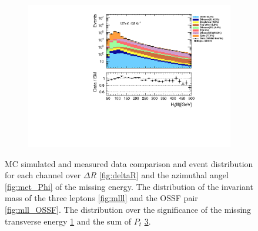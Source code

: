 \begin{figure}[H]
{\begin{subfigure}{.405\textwidth}
        \caption{}
        \label{fig:met_Sign}
    \end{subfigure}
    \hfill
    \begin{subfigure}{.525\textwidth}
        \includegraphics[width=\textwidth]{Figures/FeaturesHistograms/Ht_lll.pdf}
        \caption{}
        \label{fig:Ht_lll}
    \end{subfigure}
    }
    \caption[\ac{MC} simulated and measured data comparison and event distribution for each channel over $\Delta R$ \ref{fig:deltaR}
    and the azimuthal angle of the missing energy. The distribution of the invariant mass of the three leptons and the OSSF pair. 
    The distribution over the significance of the missing transverse energy and the sum of $P_t$.]{\ac{MC} simulated and measured data 
    comparison and event distribution for each channel over $\Delta R$ \ref{fig:deltaR} and the azimuthal
    angel \ref{fig:met_Phi} of the missing energy. The distribution of the invariant mass of the
    three leptons \ref{fig:mlll} and the OSSF pair \ref{fig:mll_OSSF}. The distribution over the significance
    of the missing transverse energy \ref{fig:met_Sign} and the sum of $P_t$ \ref{fig:Ht_lll}.}
\end{figure}
\newpage
